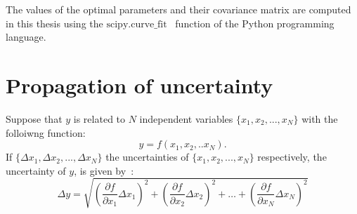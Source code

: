 The values of the optimal parameters and their covariance matrix are computed in this thesis using the $\mathrm{scipy.curve \_ fit}$~\cite{scipy_curve_fit} function of the Python programming language.

\section{Propagation of uncertainty}\label{app:uncertainty_propagation}
Suppose that $y$ is related to $N$ independent variables $\{x_1, x_2, ..., x_N\}$ with the folloiwng function:
\begin{equation}
    y=f(x_1, x_2, .. x_N).
\end{equation}
If $\{\Delta x_1, \Delta x_2, ..., \Delta x_N\}$ the uncertainties of $\{x_1, x_2, ..., x_N\}$ respectively, the uncertainty of $y$, is given by~\cite{lvp.b313005720130101}:
\begin{equation}\label{eq:uncertainty_propagation}
    \Delta y = \sqrt{\left ( \frac{\partial f}{\partial x_1} \Delta x_1  \right )^2 + \left ( \frac{\partial f}{\partial x_2} \Delta x_2  \right )^2 + \dots + \left ( \frac{\partial f}{\partial x_N} \Delta x_N  \right )^2}
\end{equation}




